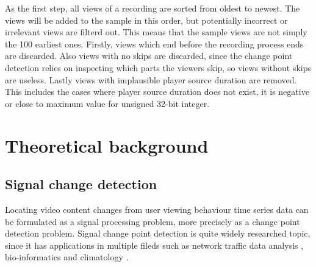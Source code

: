 As the first step, all views of a recording are sorted from oldest to newest. The views will be added to the sample in this order, but potentially incorrect or irrelevant views are filterd out. This means that the sample views are not simply the 100 earliest ones. Firstly, views which end before the recording process ends are discarded. %
Also views with no skips are discarded, since the change point detection relies on inspecting which parts the viewers skip, so views without skips are useless. %
Lastly views with implausible player source duration are removed. This includes the cases where player source duration does not exist, it is negative or close to maximum value for unsigned 32-bit integer. %

\section{Theoretical background} \label{sec:background}

\subsection{Signal change detection} \label{subsec:methods} %


Locating video content changes from user viewing behaviour time series data can be formulated as a signal processing problem, more precisely as a change point detection problem. Signal change point detection is quite widely researched topic, since it has applications in multiple fileds such as network traffic data analysis \cite{levy-leducDetectionLocalizationChangepoints2009} \cite{lung-yut-fongDistributedDetectionLocalization2012}, bio-informatics \cite{liuChangepointDetectionMethod2018} \cite{vertFastDetectionMultiple2010} and climatology \cite{reevesReviewComparisonChangepoint2007} \cite{verbesseltDetectingTrendSeasonal2010a}.

